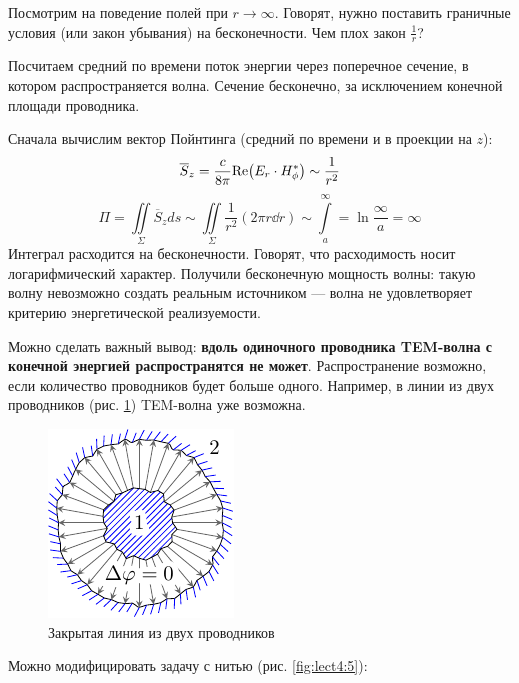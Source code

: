 Посмотрим на поведение полей при $r\to\infty$. Говорят, нужно поставить граничные условия (или закон убывания) на
бесконечности. Чем плох закон $\frac{1}{r}$?

Посчитаем средний по времени поток энергии через поперечное сечение, в котором распространяется волна. Сечение
бесконечно, за исключением конечной площади проводника.

Сначала вычислим вектор Пойнтинга (средний по времени и в проекции на $z$):
\begin{equation*}
\overline{S}_z=\frac{c}{8 \pi}\mathrm{Re}\qty(E_r\cdot H_\phi^*)\sim\frac{1}{r^2}
\end{equation*}
\begin{equation*}
\Pi=\iint\limits_\Sigma \overline{S}_z ds \sim
\iint\limits_\Sigma \frac{1}{r^2} (2\pi r \dd{r})
\sim \int\limits_a^\infty = \ln\frac{\infty}{a}=\infty
\end{equation*}
Интеграл расходится на бесконечности. Говорят, что расходимость носит логарифмический характер. Получили бесконечную мощность волны: такую волну невозможно создать реальным источником --- волна не удовлетворяет критерию энергетической реализуемости.

Можно сделать важный вывод: \textbf{вдоль одиночного проводника TEM-волна с конечной энергией распространятся не может}. Распространение возможно, если количество проводников будет больше одного. Например, в линии из двух проводников (рис. \ref{fig:lect4:4}) TEM-волна уже возможна.

\begin{figure}[h!]
	\centering
	\includegraphics[scale=1.5]{img/lect4_ris4}
	\caption{Закрытая линия из двух проводников}
	\label{fig:lect4:4}
\end{figure}

Можно модифицировать задачу с нитью (рис. \ref{fig:lect4:5}):


